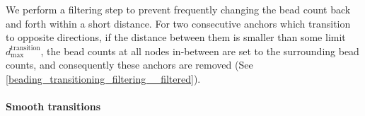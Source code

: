 We perform a filtering step to prevent frequently changing the bead count back and forth within a short distance.
For two consecutive anchors which transition to opposite directions, if the distance between them is smaller than some limit $d_\text{max}^\text{transition}$, the bead counts at all nodes in-between are set to the surrounding bead counts, and consequently these anchors are removed (See \cref{beading_transitioning_filtering__filtered}).







\paragraph{Smooth transitions}

